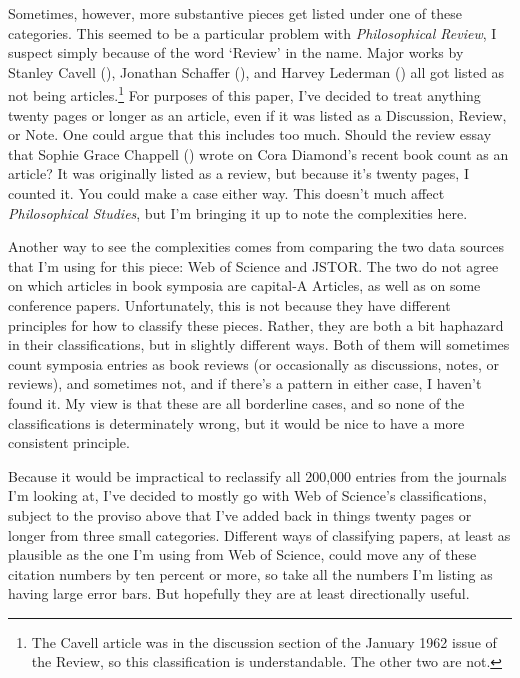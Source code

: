 \documentclass[
  10pt,
  letterpaper,
  DIV=11,
  numbers=noendperiod,
  twoside]{scrartcl}
\begin{document}
Sometimes, however, more substantive pieces get listed under one of
these categories. This seemed to be a particular problem with
\emph{Philosophical Review}, I suspect simply because of the word
`Review' in the name. Major works by Stanley Cavell
(), Jonathan Schaffer
(), and Harvey Lederman
() all got listed as not being
articles.\footnote{The Cavell article was in the discussion section of
  the January 1962 issue of the Review, so this classification is
  understandable. The other two are not.} For purposes of this paper,
I've decided to treat anything twenty pages or longer as an article,
even if it was listed as a Discussion, Review, or Note. One could argue
that this includes too much. Should the review essay that Sophie Grace
Chappell () wrote on Cora
Diamond's recent book count as an article? It was originally listed as a
review, but because it's twenty pages, I counted it. You could make a
case either way. This doesn't much affect \emph{Philosophical Studies},
but I'm bringing it up to note the complexities here.

Another way to see the complexities comes from comparing the two data
sources that I'm using for this piece: Web of Science and JSTOR. The two
do not agree on which articles in book symposia are capital-A Articles,
as well as on some conference papers. Unfortunately, this is not because
they have different principles for how to classify these pieces. Rather,
they are both a bit haphazard in their classifications, but in slightly
different ways. Both of them will sometimes count symposia entries as
book reviews (or occasionally as discussions, notes, or reviews), and
sometimes not, and if there's a pattern in either case, I haven't found
it. My view is that these are all borderline cases, and so none of the
classifications is determinately wrong, but it would be nice to have a
more consistent principle.

Because it would be impractical to reclassify all 200,000 entries from
the journals I'm looking at, I've decided to mostly go with Web of
Science's classifications, subject to the proviso above that I've added
back in things twenty pages or longer from three small categories.
Different ways of classifying papers, at least as plausible as the one
I'm using from Web of Science, could move any of these citation numbers
by ten percent or more, so take all the numbers I'm listing as having
large error bars. But hopefully they are at least directionally useful.
\end{document}
